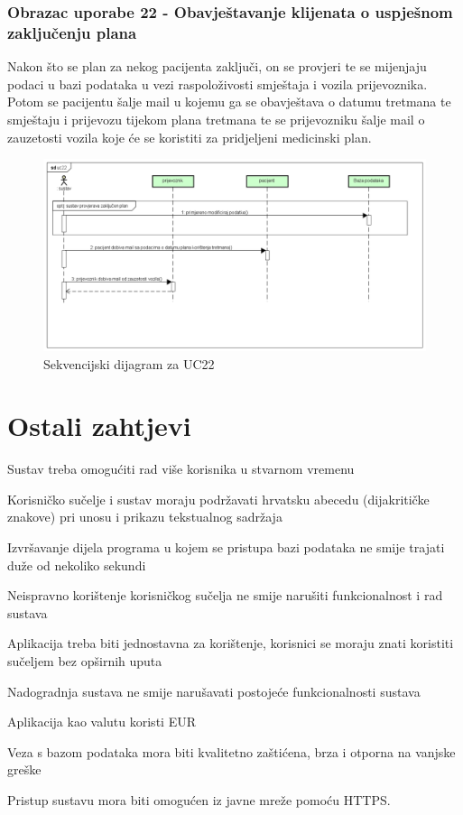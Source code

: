 			\subsubsection{Obrazac uporabe 22 - Obavještavanje klijenata o uspješnom zaključenju plana}
			Nakon što se plan za nekog pacijenta zaključi, on se provjeri te se mijenjaju podaci u bazi podataka u vezi raspoloživosti smještaja i vozila prijevoznika. Potom se pacijentu šalje mail u kojemu ga se obavještava o datumu tretmana te smještaju i prijevozu tijekom plana tretmana te se prijevozniku šalje mail o zauzetosti vozila koje će se koristiti za pridjeljeni medicinski plan.
			\begin{figure}[H]
				\centering
				\includegraphics[width=\textwidth]{slike/uc22.png} %
				\caption{Sekvencijski dijagram za UC22}
				\label{fig:Sekvencijski dijagram za UC22}
			\end{figure}
			\eject		
	
		\section{Ostali zahtjevi}
		
			\begin{packed_item}
				\item Sustav treba omogućiti rad više korisnika u stvarnom vremenu
				\item Korisničko sučelje i sustav moraju podržavati hrvatsku abecedu (dijakritičke znakove) pri unosu i prikazu tekstualnog sadržaja
				\item Izvršavanje dijela programa u kojem se pristupa bazi podataka ne smije trajati duže od nekoliko sekundi
				\item Neispravno korištenje korisničkog sučelja ne smije narušiti funkcionalnost i rad sustava
				\item Aplikacija treba biti jednostavna za korištenje, korisnici se moraju znati koristiti sučeljem bez opširnih uputa
				\item Nadogradnja sustava ne smije narušavati postojeće funkcionalnosti sustava
				\item Aplikacija kao valutu koristi EUR
				\item Veza s bazom podataka mora biti kvalitetno zaštićena, brza i otporna na vanjske greške
				\item Pristup sustavu mora biti omogućen iz javne mreže pomoću HTTPS.
			\end{packed_item}			 